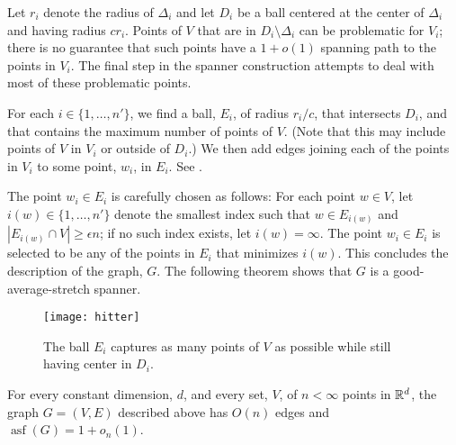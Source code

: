 \documentclass{patmorin}
\DeclareMathOperator{\asf}{asf}
\begin{document}
Let $r_i$ denote the radius of $\Delta_i$ and let $D_i$ be a ball centered
at the center of $\Delta_i$ and having radius $cr_i$.  Points of $V$
that are in $D_i\setminus \Delta_i$ can be problematic for $V_i$; there
is no guarantee that such points have a $1+o(1)$ spanning path to the
points in $V_i$.  The final step in the spanner construction attempts
to deal with most of these problematic points.

For each $i\in\{1,\ldots,n'\}$, we find a ball, $E_i$, of radius $r_i/c$,
that intersects $D_i$, and that contains the maximum number of points
of $V$.  (Note that this may include points of $V$ in $V_i$ or outside
of $D_i$.)  We then add edges joining each of the points in $V_i$ to
some point, $w_i$, in $E_i$.  See .

The point $w_i\in E_i$ is carefully chosen as follows: For each point
$w\in V$, let $i(w)\in \{1,\ldots,n'\}$ denote the smallest index such
that $w\in E_{i(w)}$ and $|E_{i(w)}\cap V| \ge \epsilon n$; if no such
index exists, let $i(w)=\infty$.  The point $w_i\in E_i$ is selected
to be any of the points in $E_i$ that minimizes $i(w)$.  This concludes
the description of the graph, $G$.  The following theorem shows that $G$
is a good-average-stretch spanner.

\begin{figure}
  \begin{center}
    \texttt{[image: hitter]}
  \end{center}
  \caption{The ball $E_i$ captures as many points of $V$ as possible
   while still having center in $D_i$.}
\end{figure}

\begin{thm}
  For every constant dimension, $d$, and every set, $V$, of
  $n<\infty$ points in $\mathbb{R}^d$, the graph $G=(V,E)$ described above
  has $O(n)$ edges and $\asf(G)=1+o_n(1)$.
\end{thm}
\end{document}
